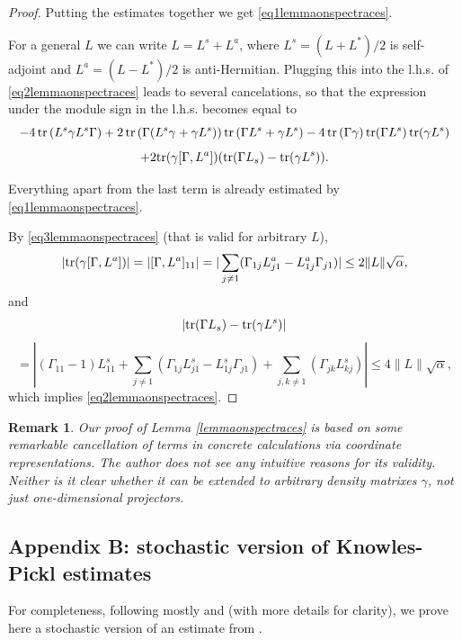 \documentclass[12pt]{article}
\def\tr{\rm{tr}}
\def\al{\alpha}
\def\ga{\gamma}
\newtheorem{remark}{Remark}
\newcommand{\Ga}{\Gamma}
\begin{document}
\begin{proof}
Putting the estimates together we get \eqref{eq1lemmaonspectraces}.

For a general $L$ we can write $L=L^s+L^a$, where $L^s=(L+L^*)/2$ is self-adjoint and
$L^a=(L-L^*)/2$ is anti-Hermitian. Plugging this into the l.h.s.
of \eqref{eq2lemmaonspectraces} leads to several cancelations, so that
 the expression under the module sign in the l.h.s. becomes equal to
\[
-4\,{\tr}\, (L^s\ga L^s\Ga )+2 \,{\tr}\,(\Ga(L^s \ga+\ga L^s))\,{\tr}\,(\Ga L^s+\ga L^s)
-4 \,{\tr}\,(\Ga \ga)\, {\tr} (\Ga L^s)\, {\tr} (\ga L^s)
\]
\[
+2{\tr} (\ga [\Ga, L^a])({\tr} (\Ga L_s)-{\tr} (\ga L^s)).
\]

Everything apart from the last term is already estimated  by \eqref{eq1lemmaonspectraces}.

By \eqref{eq3lemmaonspectraces} (that is valid for arbitrary $L$),
\[
|{\tr} (\ga [\Ga, L^a])|=|[\Ga,L^a]_{11}|=|\sum_{j\neq 1} (\Ga_{1j}L^a_{j1}-L^a_{1j}\Ga_{j1})|
\le 2\|L\| \sqrt \al,
\]
and
\[
|{\tr} (\Ga L_s)-{\tr} (\ga L^s)|
\]
\[
=|(\Ga_{11}-1)L^s_{11}+\sum_{j\neq 1} (\Ga_{1j}L^s_{j1}-L^s_{1j}\Ga_{j1})
+\sum_{j,k\neq 1} (\Ga_{jk}L^s_{kj})|\le 4 \|L\| \sqrt \al,
\]
which implies \eqref{eq2lemmaonspectraces}.
 \end{proof}

\begin{remark} Our proof of Lemma \ref{lemmaonspectraces} is based on some remarkable
cancellation of terms in concrete calculations
via coordinate representations. The author does not see any intuitive reasons for its validity.
Neither is it clear whether it can be extended to arbitrary density matrixes $\ga$,
not just one-dimensional projectors.
\end{remark}


\subsection{Appendix B: stochastic version of Knowles-Pickl estimates}
\label{secKP}

For completeness, following mostly \cite{KolQuantMFG} and \cite{KnowlesPickl}
(with more details for clarity),
we prove here a stochastic version of an estimate from \cite{KnowlesPickl}.
\end{document}
